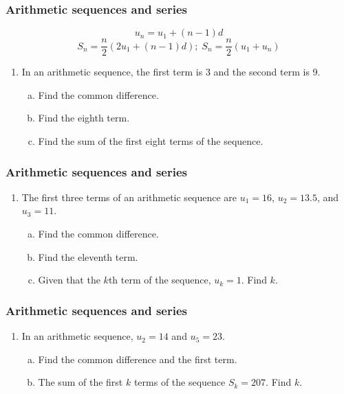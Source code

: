 \documentclass{beamer}
\begin{document}
\frame
{
  \frametitle{Arithmetic sequences and series}
  \[u_n=u_1+(n-1)d\]
  \[S_n=\frac{n}{2}(2u_1+(n-1)d); \; S_n=\frac{n}{2}(u_1+u_n)\]
  \begin{enumerate}
    \item In an arithmetic sequence, the first term is 3 and the second term is 9.
      \begin{enumerate}[(a)]
          \item Find the common difference. \vspace{0.5cm}
          \item Find the eighth term.\vspace{1cm}
          \item Find the sum of the first eight terms of the sequence.
      \end{enumerate}
    \end{enumerate}\vspace{5cm}
    }

\frame
{
  \frametitle{Arithmetic sequences and series}
  \begin{enumerate}
    \item The first three terms of an arithmetic sequence are $u_1=16$, $u_2=13.5$, and $u_3=11$.
      \begin{enumerate}[(a)]
          \item Find the common difference. \vspace{1cm}
          \item Find the eleventh term.\vspace{2cm}
          \item Given that the $k$th term of the sequence, $u_k=1$. Find $k$.
      \end{enumerate}
    \end{enumerate}\vspace{8cm}
    }

\frame
{
  \frametitle{Arithmetic sequences and series}
  \begin{enumerate}
    \item In an arithmetic sequence, $u_2=14$ and $u_5=23$.
      \begin{enumerate}[(a)]
          \item Find the common difference and the first term. \vspace{2.5cm}
          \item The sum of the first $k$ terms of the sequence $S_k=207$. Find $k$.
      \end{enumerate}
    \end{enumerate}\vspace{5cm}
    }
\end{document}
